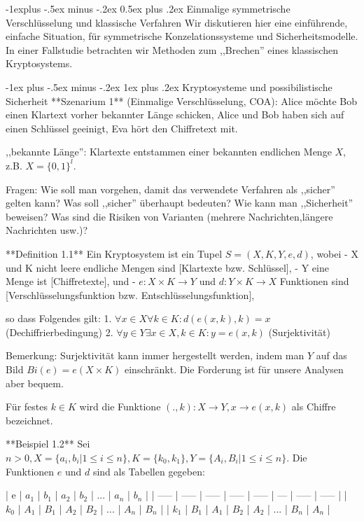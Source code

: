 \documentclass[a4paper]{article}
\makeatletter
\renewcommand{\subsection}{\@startsection{subsection}{2}{0mm}%
 {-1explus -.5ex minus -.2ex}%
 {0.5ex plus .2ex}%
 {\normalfont\normalsize\bfseries}}
\renewcommand{\subsubsection}{\@startsection{subsubsection}{3}{0mm}%
 {-1ex plus -.5ex minus -.2ex}%
 {1ex plus .2ex}%
 {\normalfont\small\bfseries}}
\makeatother
\begin{document}
\begin{multicols}{3}
    \subsection{Einmalige symmetrische Verschlüsselung und klassische Verfahren}
    Wir diskutieren hier eine einführende, einfache Situation, für symmetrische Konzelationssysteme und Sicherheitsmodelle. In einer Fallstudie betrachten wir Methoden zum ,,Brechen'' eines klassischen Kryptosystems.

    \subsubsection{Kryptosysteme und possibilistische Sicherheit}
    **Szenarium 1** (Einmalige Verschlüsselung, COA): Alice möchte Bob einen Klartext vorher bekannter Länge schicken, Alice und Bob haben sich auf einen Schlüssel geeinigt, Eva hört den Chiffretext mit.

    ,,bekannte Länge'': Klartexte entstammen einer bekannten endlichen Menge $X$, z.B. $X=\{0,1\}^l$.

    Fragen: Wie soll man vorgehen, damit das verwendete Verfahren als ,,sicher'' gelten kann? Was soll ,,sicher'' überhaupt bedeuten? Wie kann man ,,Sicherheit'' beweisen? Was sind die Risiken von Varianten (mehrere Nachrichten,längere Nachrichten usw.)?

    **Definition 1.1** Ein Kryptosystem ist ein Tupel $S=(X,K,Y,e,d)$, wobei
    - X und K nicht leere endliche Mengen sind [Klartexte bzw. Schlüssel],
    - Y eine Menge ist [Chiffretexte], und
    - $e:X\times K\rightarrow Y$ und $d:Y\times K\rightarrow X$ Funktionen sind [Verschlüsselungsfunktion bzw. Entschlüsselungsfunktion],

    so dass Folgendes gilt:
    1. $\forall x\in X\forall k\in K:d(e(x,k),k) =x$ (Dechiffrierbedingung)
    2. $\forall y\in Y\exists x\in X,k\in K:y=e(x,k)$ (Surjektivität)

    Bemerkung: Surjektivität kann immer hergestellt werden, indem man $Y$ auf das Bild $Bi(e) =e(X\times K)$ einschränkt. Die Forderung ist für unsere Analysen aber bequem.

    Für festes $k\in K$ wird die Funktione $(.,k):X\rightarrow Y,x \rightarrow e(x,k)$ als Chiffre bezeichnet.

    **Beispiel 1.2** Sei $n>0, X=\{a_i,b_i| 1\leq i\leq n\},K=\{k_0,k_1\},Y=\{A_i,B_i| 1\leq i\leq n\}$. Die Funktionen $e$ und $d$ sind als Tabellen gegeben:

    | e     | $a_1$ | $b_1$ | $a_2$ | $b_2$ | ... | $a_n$ | $b_n$ |
    | ----- | ----- | ----- | ----- | ----- | --- | ----- | ----- |
    | $k_0$ | $A_1$ | $B_1$ | $A_2$ | $B_2$ | ... | $A_n$ | $B_n$ |
    | $k_1$ | $B_1$ | $A_1$ | $B_2$ | $A_2$ | ... | $B_n$ | $A_n$ |


\end{multicols}
\end{document}
